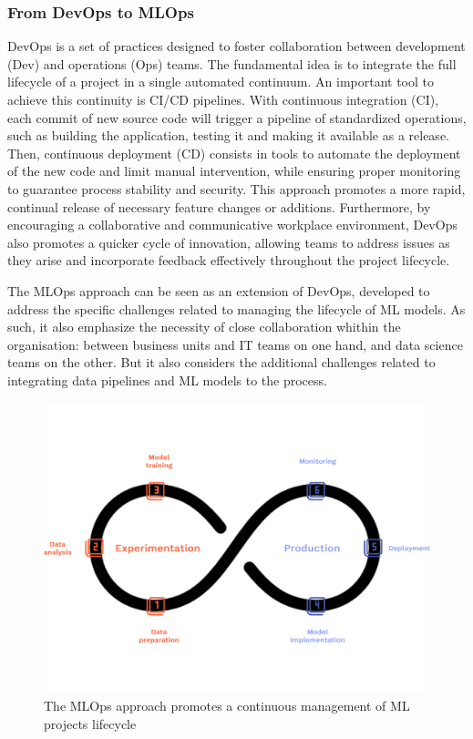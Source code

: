 \subsubsection{From DevOps to MLOps}

DevOps is a set of practices designed to foster collaboration between development (Dev) and operations (Ops) teams. The fundamental idea is to integrate the full lifecycle of a project in a single automated continuum. An important tool to achieve this continuity is CI/CD pipelines. With continuous integration (CI), each commit of new source code will trigger a pipeline of standardized operations, such as building the application, testing it and making it available as a release. Then, continuous deployment (CD) consists in tools to automate the deployment of the new code and limit manual intervention, while ensuring proper monitoring to guarantee process stability and security. This approach promotes a more rapid, continual release of necessary feature changes or additions. Furthermore, by encouraging a collaborative and communicative workplace environment, DevOps also promotes a quicker cycle of innovation, allowing teams to address issues as they arise and incorporate feedback effectively throughout the project lifecycle.

The MLOps approach can be seen as an extension of DevOps, developed to address the specific challenges related to managing the lifecycle of ML models. As such, it also emphasize the necessity of close collaboration whithin the organisation: between business units and IT teams on one hand, and data science teams on the other. But it also considers the additional challenges related to integrating data pipelines and ML models to the process.

\begin{figure}[htbp]
    \centering
    \includegraphics[width=\textwidth]{sections/img/mlops-cycle.png}
    \caption{The MLOps approach promotes a continuous management of ML projects lifecycle}
    \label{fig:mlops-cycle}
\end{figure}


